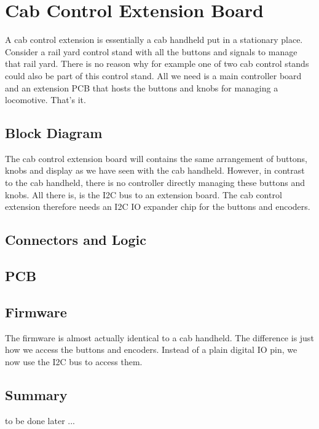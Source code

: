 \chapter{Cab Control Extension Board}

A cab control extension is essentially a cab handheld put in a stationary place. Consider a rail yard control stand with all the buttons and signals to manage that rail yard. There is no reason why for example one of two cab control stands could also be part of this control stand. All we need is a main controller board and an extension PCB that hosts the buttons and knobs for managing a locomotive. That's it.

\section{Block Diagram}

The cab control extension board will contains the same arrangement of buttons, knobs and display as we have seen with the cab handheld. However, in contrast to the cab handheld, there is no controller directly managing these buttons and knobs. All there is, is the I2C bus to an extension board. The cab control extension therefore needs an I2C IO expander chip for the buttons and encoders.


\section{Connectors and Logic}


\section{PCB}


\section{Firmware}

The firmware is almost actually identical to a cab handheld. The difference is just how we access the buttons and encoders. Instead of a plain digital IO pin, we now use the I2C bus to access them.

\section{Summary}

to be done later ...
